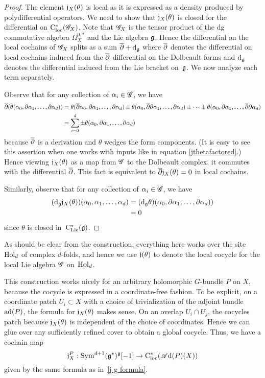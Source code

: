 \begin{proof} 
The element $\mathfrak j_X(\theta)$ is local as it is expressed as a density produced by polydifferential operators.
We need to show that $\mathfrak j_X(\theta)$ is closed for the differential on ${\rm C}_{\rm loc}^*(\mathscr G_X)$. 
Note that $\mathscr G_X$ is the tensor product of the dg commutative algebra $\Omega^{0,*}_X$ and the Lie algebra $\mathfrak g$.
Hence the differential on the local cochains of $\mathscr G_X$ splits as a sum $\overline{\partial} + {\rm d}_{\mathfrak g}$ where $\overline{\partial}$ denotes the differential on local cochains induced from the $\overline{\partial}$ differential on the Dolbeault forms and ${\rm d}_{\mathfrak g}$ denotes the differential induced from the Lie bracket on~$\mathfrak g$. 
We now analyze each term separately.

Observe that for any collection of $\alpha_i \in \mathscr G$, we have
\begin{align*}
\overline{\partial}(\theta(\alpha_0,\partial \alpha_1,\ldots,\partial \alpha_d)) 
&= \theta(\overline{\partial}\alpha_0,\partial \alpha_1,\ldots,\partial \alpha_d) \pm \theta(\alpha_0,\overline{\partial} \partial \alpha_1,\ldots,\partial \alpha_d) \pm \cdots \pm \theta(\alpha_0,\partial \alpha_1,\ldots,\overline{\partial}\partial \alpha_d)\\
&= \sum_{i = 0}^d \pm \theta(\alpha_0,\partial \alpha_1,\ldots,\partial \alpha_d)
\end{align*}
because $\overline{\partial}$ is a derivation and $\theta$ wedges the form components.
(It is easy to see this assertion when one works with inputs like in equation \eqref{jthetafactored}.)
Hence viewing $\mathfrak j_X(\theta)$ as a map from $\mathscr G$ to the Dolbeault complex, 
it commutes with the differential $\overline{\partial}$.
This fact is equivalent to $\overline{\partial} \mathfrak j_X(\theta) = 0$ in local cochains.

Similarly, observe that for any collection of $\alpha_i \in \mathscr G$, we have
\begin{align*}
({\rm d}_\mathfrak g \mathfrak j_X(\theta))(\alpha_0, \alpha_1,\ldots, \alpha_d)
&= ({\rm d}_\mathfrak g\theta)(\alpha_0,\partial \alpha_1,\ldots,\partial \alpha_d)) \\
&= 0
\end{align*}
since $\theta$ is closed in~${\rm C}_{\rm Lie}^*(\mathfrak g)$.
\end{proof}

As should be clear from the construction, everything here works over the site ${\rm Hol}_d$ of complex $d$-folds, and hence we use $\mathfrak j(\theta)$ to denote the local cocycle for the local Lie algebra $\mathscr G$ on~${\rm Hol}_d$.

This construction works nicely for an arbitrary holomorphic $G$-bundle $P$ on $X$,
because the cocycle is expressed in a coordinate-free fashion.
To be explicit, on a coordinate patch $U_i \subset X$ with a choice of trivialization of the adjoint bundle ${\rm ad}(P)$,
the formula for $\mathfrak j_X(\theta)$ makes sense.
On an overlap $U_i \cap U_j$, the cocycles patch because $\mathfrak j_X(\theta)$ is independent of the choice of coordinates.
Hence we can glue over any sufficiently refined cover to obtain a global cocycle. 
Thus, we have a cochain map
\[
\mathfrak j_X^P : {\rm Sym}^{d+1} (\mathfrak g^*)^\mathfrak g [-1] \to {\rm C}_{\rm loc}^*(\mathscr A{\rm d}(P)(X))
\]
given by the same formula as in~\eqref{j g formula}.

